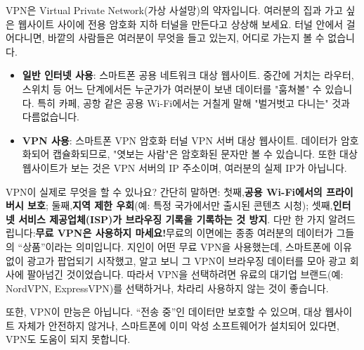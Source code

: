 


VPN은 Virtual Private Network(가상 사설망)의 약자입니다. 여러분의 집과 가고 싶은 웹사이트 사이에 전용 암호화 지하 터널을 만든다고 상상해 보세요. 터널 안에서 걸어다니면, 바깥의 사람들은 여러분이 무엇을 들고 있는지, 어디로 가는지 볼 수 없습니다.

\begin{itemize}
  \item \textbf{일반 인터넷 사용}: 스마트폰 공용 네트워크 대상 웹사이트. 중간에 거치는 라우터, 스위치 등 어느 단계에서든 누군가가 여러분이 보낸 데이터를 "훔쳐볼" 수 있습니다. 특히 카페, 공항 같은 공용 Wi-Fi에서는 거칠게 말해 "벌거벗고 다니는" 것과 다름없습니다.
  \item \textbf{VPN 사용}: 스마트폰 VPN 암호화 터널 VPN 서버 대상 웹사이트. 데이터가 암호화되어 캡슐화되므로, "엿보는 사람"은 암호화된 문자만 볼 수 있습니다. 또한 대상 웹사이트가 보는 것은 VPN 서버의 IP 주소이며, 여러분의 실제 IP가 아닙니다.
\end{itemize}

VPN이 실제로 무엇을 할 수 있나요? 간단히 말하면: 첫째,\textbf{공용 Wi-Fi에서의 프라이버시 보호}; 둘째,\textbf{지역 제한 우회}(예: 특정 국가에서만 출시된 콘텐츠 시청); 셋째,\textbf{인터넷 서비스 제공업체(ISP)가 브라우징 기록을 기록하는 것 방지}. 다만 한 가지 알려드립니다:\textbf{무료 VPN은 사용하지 마세요!}무료의 이면에는 종종 여러분의 데이터가 그들의 “상품”이라는 의미입니다. 지인이 어떤 무료 VPN을 사용했는데, 스마트폰에 이유 없이 광고가 팝업되기 시작했고, 알고 보니 그 VPN이 브라우징 데이터를 모아 광고 회사에 팔아넘긴 것이었습니다. 따라서 VPN을 선택하려면 유료의 대기업 브랜드(예: NordVPN, ExpressVPN)를 선택하거나, 차라리 사용하지 않는 것이 좋습니다.

또한, VPN이 만능은 아닙니다. “전송 중”인 데이터만 보호할 수 있으며, 대상 웹사이트 자체가 안전하지 않거나, 스마트폰에 이미 악성 소프트웨어가 설치되어 있다면, VPN도 도움이 되지 못합니다.

